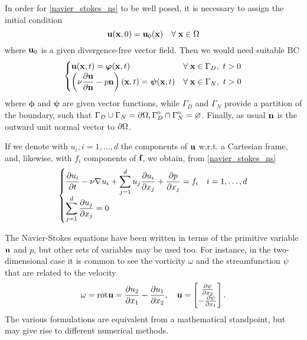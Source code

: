 In order for \eqref{navier_stokes_ns} to be well posed, it is necessary to assign the initial condition 
\begin{equation}
    \textbf{u}(\textbf{x}, 0) = \textbf{u}_0(\textbf{x}) \quad \forall \; \textbf{x} \in \Omega
    \label{initial_condition_ns}
\end{equation}
where \(\textbf{u}_0\) is a given divergence-free vector field. Then we would need suitable BC
\begin{equation}
    \begin{cases}
        \uvec(\xvec, t) = \bm{\phi}(\xvec, t) & \forall \; \xvec \in \Gamma_D, \ t > 0 \\
        \displaystyle \left( \nu \partialderivative{\uvec}{\vect{n}} - p\normal  \right)\left( \xvec, t \right) = \bm{\psi}(\xvec, t) & \forall \; \xvec \in \Gamma_N, \ t > 0 
    \end{cases}
    \label{boundaries_ns}
\end{equation}
where \(\bm{\phi}\) and \(\bm{\psi}\) are given vector functions, while \(\Gamma_D\) and \(\Gamma_N\) provide a partition of the boundary, such that \(\Gamma_D \cup \Gamma_N = {\partial\Omega}, {\kern0pt\Gamma}^{\mathrm{o}}_D \cap {\kern0pt\Gamma}^{\mathrm{o}}_N =\varnothing\).
Finally, as usual \(\textbf{n}\) is the outward unit normal vector to \({\partial\Omega}\).

If we denote with \(u_i, i = 1,\ldots, d\) the components of \(\textbf{u}\) w.r.t. a Cartesian frame, and, likewise, with \(f_i\) components of \(\textbf{f}\), we obtain, from \eqref{navier_stokes_ns}
\[
    \begin{cases}
        \displaystyle \partialderivative{u_i}{t} - \nu \grad u_i + \sum_{j=1}^{d} u_j\partialderivative{u_i}{x_j} + \partialderivative{p}{x_j} = f_i & i = 1,\ldots, d \\
        \displaystyle \sum_{j=1}^{d} \partialderivative{u_j}{x_j} = 0
    \end{cases}
\]
\begin{remark}
    The Navier-Stokes equations have been written in terms of the primitive variable \(\textbf{u}\) and \(p\), but other sets of variables may be used too. For instance, in the two-dimensional case it is common to see the vorticity \(\omega\) and the streamfunction \(\psi\) that are related to the velocity
    \begin{equation*}
        \omega =\rot\uvec = \partialderivative{u_2}{x_1} - \partialderivative{u_1}{x_2}, \quad \uvec = \left[ \begin{matrix*}
            \partialderivative{\psi}{x_2} \\
            -\partialderivative{\psi}{x_1}
        \end{matrix*} \right].
    \end{equation*}
    The various formulations are equivalent from a mathematical standpoint, but may give rise to different numerical methods.
\end{remark}
